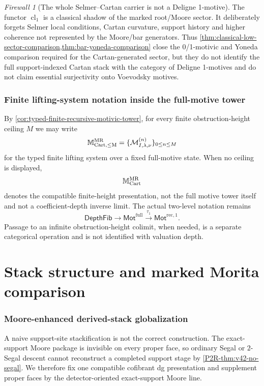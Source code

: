 \documentclass[11pt]{article}
\theoremstyle{remark}
\providecommand{\RecOneMot}{\mathsf{Mot}^{\mathrm{rec},1}}
\providecommand{\FullMot}{\mathsf{Mot}^{\mathrm{full}}}
\providecommand{\tauone}{\tau_{1}}
\providecommand{\DepthFib}{\mathsf{DepthFib}}
\newtheorem{firewall}{Firewall}[section]
\begin{document}
\begin{firewall}[The whole Selmer--Cartan carrier is not a Deligne 1-motive]
\label{fw:cartan-layer-not-classical-motive}
The functor $\operatorname{cl}_1$ is a classical shadow of the marked root/Moore sector.
It deliberately forgets Selmer local conditions, Cartan curvature, support history and
higher coherence not represented by the Moore/bar generators.  Thus
\cref{thm:classical-low-sector-comparison,thm:bar-yoneda-comparison} close the
0/1-motivic and Yoneda comparison required for the Cartan-generated sector, but they do
not identify the full support-indexed Cartan stack with the category of Deligne 1-motives and
do not claim essential surjectivity onto Voevodsky motives.
\end{firewall}

\section{Finite lifting-system notation inside the full-motive tower}\label{sec:provisional-full-tower}
By \cref{cor:typed-finite-recursive-motivic-tower}, for every finite obstruction-height ceiling
$M$ we may write
\[
 \mathbb M_{\rm Cart,\le M}^{\rm MR}
 =\{\mathcal M^{(n)}_{I,\lambda,\nu}\}_{0\le n\le M}
\]
for the typed finite lifting system over a fixed full-motive state.  When no ceiling is displayed,
\[
 \mathbb M_{\rm Cart}^{\rm MR}
\]
denotes the compatible finite-height presentation, not the full motive tower itself
and not a coefficient-depth inverse limit.  The actual
two-level notation remains
\[
 \DepthFib\longrightarrow\FullMot
 \stackrel{\tauone}{\longrightarrow}\RecOneMot.
\]
Passage to an infinite obstruction-height colimit, when needed, is a separate
categorical operation and is not identified with valuation depth.

\part{Stack structure and marked Morita comparison}

\section{Moore-enhanced derived-stack globalization}
\label{sec:stackification}

A naive support-site stackification is not the correct construction.  The
exact-support Moore package is invisible on every proper face, so ordinary
Segal or \(2\)-Segal descent cannot reconstruct a completed support stage by
\cref{P2R-thm:v42-no-segal}.  We therefore fix one compatible cofibrant dg
presentation and supplement proper faces by the detector-oriented
exact-support Moore line.
\end{document}
